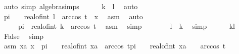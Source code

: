 \begin{isabellebody}
\ {\isacharparenleft}{\kern0pt}auto\ simp{\isacharcolon}{\kern0pt}\ algebra{\isacharunderscore}{\kern0pt}simps{\isacharparenright}{\kern0pt}\isanewline
\ \ \ \ \isamarkupfalse%
\ {\isachardoublequoteopen}k\ {\isasymle}\ l{\isachardoublequoteclose}\ \isamarkupfalse%
\ auto\isanewline
\ \ \ \ \isamarkupfalse%
\ {\isachardoublequoteopen}pi\ {\isacharasterisk}{\kern0pt}\ {\isacharparenleft}{\kern0pt}{}\ {\isacharasterisk}{\kern0pt}\ real{\isacharunderscore}{\kern0pt}of{\isacharunderscore}{\kern0pt}int\ l{\isacharparenright}{\kern0pt}\ {\isacharplus}{\kern0pt}\ arccos\ t\ {\isasymle}\ x{\isachardoublequoteclose}\ \isamarkupfalse%
\ asm\ \isamarkupfalse%
\ auto\isanewline
\ \ \ \ \isamarkupfalse%
\ \isamarkupfalse%
\ {\isachardoublequoteopen}{\isasymdots}\ {\isacharless}{\kern0pt}\ {}\ {\isacharasterisk}{\kern0pt}\ pi\ {\isacharasterisk}{\kern0pt}\ real{\isacharunderscore}{\kern0pt}of{\isacharunderscore}{\kern0pt}int\ k\ {\isacharplus}{\kern0pt}\ arccos\ t{\isachardoublequoteclose}\ \isamarkupfalse%
\ asm\ \isamarkupfalse%
\ simp\isanewline
\ \ \ \ \isamarkupfalse%
\ \isamarkupfalse%
\ {\isachardoublequoteopen}l\ {\isacharless}{\kern0pt}\ k{\isachardoublequoteclose}\ \isamarkupfalse%
\ simp\isanewline
\ \ \ \ \isamarkupfalse%
\ {\isacartoucheopen}k{\isasymle}l{\isacartoucheclose}\ \isamarkupfalse%
\ False\ \isamarkupfalse%
\ simp\isanewline
\ \ \isamarkupfalse%
\isanewline
\ \ \ \ \isamarkupfalse%
\ asm{\isacharcolon}{\kern0pt}\ {\isachardoublequoteopen}{\isasymnexists}xa{\isachardot}{\kern0pt}\ x\ {\isasymin}\ {\isacharbraceleft}{\kern0pt}pi\ {\isacharasterisk}{\kern0pt}\ {\isacharparenleft}{\kern0pt}{}\ {\isacharasterisk}{\kern0pt}\ real{\isacharunderscore}{\kern0pt}of{\isacharunderscore}{\kern0pt}int\ xa{\isacharparenright}{\kern0pt}\ {\isacharplus}{\kern0pt}\ arccos\ t{\isachardot}{\kern0pt}{\isachardot}{\kern0pt}pi\ {\isacharasterisk}{\kern0pt}\ {\isacharparenleft}{\kern0pt}{}\ {\isacharasterisk}{\kern0pt}\ {\isacharparenleft}{\kern0pt}real{\isacharunderscore}{\kern0pt}of{\isacharunderscore}{\kern0pt}int\ xa\ {\isacharplus}{\kern0pt}\ {}{\isacharparenright}{\kern0pt}{\isacharparenright}{\kern0pt}\ {\isacharminus}{\kern0pt}\ arccos\ t{\isacharbraceright}{\kern0pt}{\isachardoublequoteclose}\isanewline

\end{isabellebody}
